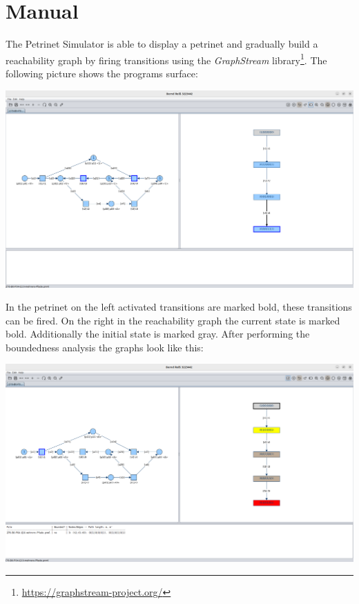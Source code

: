 \documentclass[10pt, a4paper]{article}
\begin{document}
 

\thispagestyle{empty}
\newpage 

\tableofcontents \thispagestyle{plain} \newpage


 \rmfamily \onehalfspace 

\section{Manual}
\label{label:introduction}
The Petrinet Simulator is able to display a petrinet and gradually build a reachability graph by firing transitions using the \textit{GraphStream} library\footnote{\url{https://graphstream-project.org/}}. The following picture shows the programs surface:

\begin{center}
\includegraphics[width=\textwidth]{Pictures/Example_276.png}
\end{center}

In the petrinet on the left activated transitions are marked bold, these transitions can be fired. On the right in the reachability graph the current state is marked bold. Additionally the initial state is marked gray. After performing the boundedness analysis the graphs look like this: 

\begin{center}
\includegraphics[width=\textwidth]{Pictures/Example_276_analysed.png}
\end{center}
\end{document}
